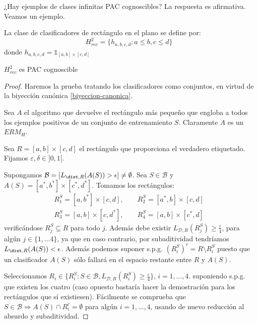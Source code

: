 ¿Hay ejemplos de clases infinitas PAC cognoscibles? La respuesta es afirmativa. Veamos un ejemplo.

\begin{example}
  \begin{definition}
  La clase de clasificadores de rectángulo en el plano se define por:
  \[
    H^2_{rec} = \{ h_{a,b,c,d}: a\le b, c\le d\}
  \]
  donde $h_{a,b,c,d} = \mathds{1}_{[a,b]\times [c,d]}$
  \label{def:rec2}
  \end{definition}
    \begin{fact}
    $H_{rec}^2$ es PAC cognoscible
    \end{fact}

    \begin{proof}
    Haremos la prueba tratando los clasificadores como conjuntos, en virtud de la biyección canónica \ref{biyeccion-canonica}.
    
    Sea $A$ el algoritmo que devuelve el rectángulo más pequeño que engloba a todos los ejemplos positivos de un conjunto 
    de entrenamiento $S$. Claramente $A$ es un $ERM_H$.

    Sea $R= [a,b]\times [c,d]$ el rectángulo que proporciona el verdadero etiquetado. Fijamos $\varepsilon, \delta \in ]0,1[$.
    
    Supongamos $\mathcal{B} = [L_{\dist,R}(A(S)) > \epsilon] \neq \emptyset$. Sea $S\in \mathcal{B}$ y 
    $A(S) = [a^{\ast}, b^{\ast}] \times [c^{\ast}, d^{\ast}]$. Tomamos los rectángulos:
    \begin{align*} 
    R_1^S = [a,b^{\ast}] \times [c,d], \qquad R_2^S = [a^{\ast},b] \times [c,d] \\ 
    R_3^S =[a,b] \times [c,d^{\ast}],   \qquad R_4^S = [a,b] \times [c^{\ast},d]     
    \end{align*}
    verificándose $R_j^S \subseteq R$ para todo $j$. Además debe existir $L_{\mathcal{D},R}(R_j^S) \ge \frac{\varepsilon}{4}$, 
    para algún $j\in \{1, \ldots 4\}$, ya que en caso contrario, por subaditividad tendríamos $L_{\dist,R}(A(S)) < \epsilon$. 
    Además podemos suponer s.p.g. $(R_i^S)^c = R\setminus R_i^S$ puesto que un clasificador $A(S)$ sólo fallará en el
    espacio restante entre $R$ y $A(S)$.
    
    Seleccionamos $R_i \in \{R_i^S: S\in \mathcal{B}, L_{\mathcal{D},R}(R_i^S)\ge \frac{\varepsilon}{4}\}$, $i=1, \ldots, 4$. suponiendo s.p.g. que existen los cuatro (caso opuesto 
    bastaría hacer la demostración para los rectángulos que sí existiesen). Fácilmente se comprueba que 
    $S\in \mathcal{B} \Rightarrow A(S) \cap R_i^c = \emptyset$ para algún $i=1, \ldots, 4$, usando de nuevo reducción al 
    absurdo y subaditividad.
    

\end{proof}
\end{example}

